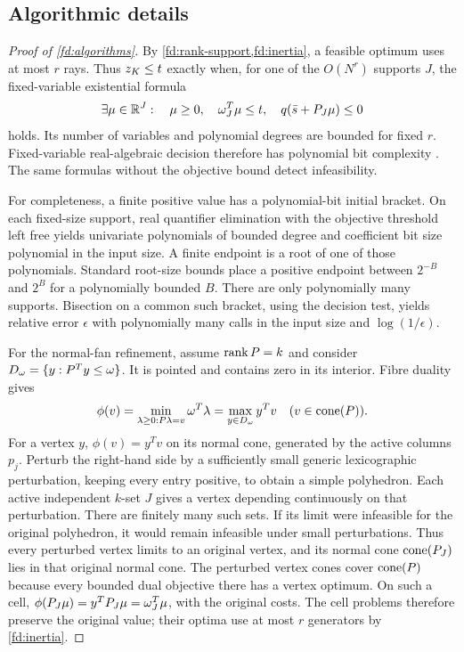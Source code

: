\subsection{Algorithmic details}

\begin{proof}[Proof of \cref{fd:algorithms}]
\label{fd:algorithm-proof}
By \cref{fd:rank-support,fd:inertia}, a feasible optimum uses at most
$r$ rays. Thus $z_K\le t$ exactly when, for one of the $O(N^r)$ supports
$J$, the fixed-variable existential formula
\[
 \exists\mu\in\mathbb R^J:\quad
 \mu\ge0,\quad \omega_J^T\mu\le t,\quad q(\bar s+P_J\mu)\le0
\]
holds. Its number of variables and polynomial degrees are bounded
for fixed $r$. Fixed-variable real-algebraic decision therefore has
polynomial bit complexity \citep[Theorem~1.1]{Renegar1992PartIII}.
The same formulas without the objective
bound detect infeasibility.

For completeness, a finite positive value has a polynomial-bit initial
bracket. On each fixed-size support, real quantifier elimination with
the objective threshold left free yields univariate polynomials of
bounded degree and coefficient bit size polynomial in the input
size. A finite endpoint is a root of one of those polynomials.
Standard root-size bounds place a positive endpoint between
$2^{-B}$ and $2^B$ for a polynomially bounded $B$. There are only
polynomially many supports. Bisection on a common such bracket,
using the decision test, yields relative error $\epsilon$ with
polynomially many calls in the input size and $\log(1/\epsilon)$.

For the normal-fan refinement, assume $\operatorname{rank} P=k$ and consider
$D_\omega=\{y:P^Ty\le\omega\}$. It is pointed and contains zero in its
interior. Fibre duality gives
\[
 \phi(v)=\min_{\lambda\ge0:P\lambda=v}\omega^T\lambda
        =\max_{y\in D_\omega}y^Tv
 \quad(v\in\operatorname{cone}(P)).
\]
For a vertex $y$, $\phi(v)=y^Tv$ on its normal cone, generated by
the active columns $p_j$.
Perturb the right-hand side by a sufficiently small generic
lexicographic perturbation, keeping every entry positive, to obtain
a simple polyhedron. Each active independent $k$-set $J$ gives a
vertex depending continuously on that perturbation. There are
finitely many such sets. If its limit were infeasible for the original
polyhedron, it would remain infeasible under small perturbations.
Thus every perturbed vertex limits to an original vertex, and its
normal cone $\operatorname{cone}(P_J)$ lies in that original normal cone.
The perturbed vertex cones cover $\operatorname{cone}(P)$ because every bounded
dual objective there has a vertex optimum.
On such a cell,
$\phi(P_J\mu)=y^TP_J\mu=\omega_J^T\mu$, with the original costs.
The cell problems therefore preserve the original value; their
optima use at most $r$ generators by \cref{fd:inertia}.


\end{proof}

